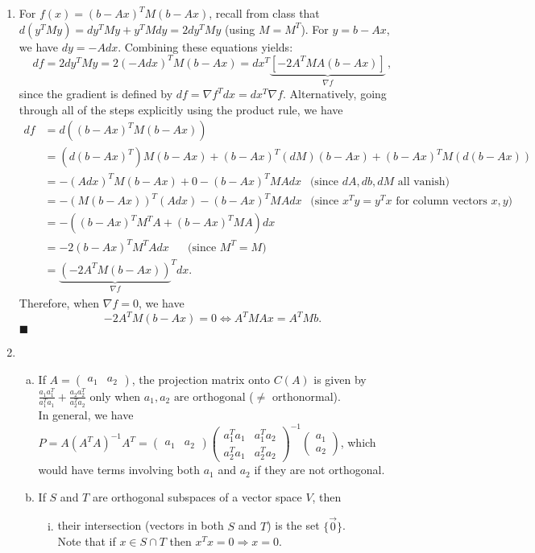 \documentclass[12pt]{article}
\begin{document}
\begin{enumerate}[1.]
    \pagebreak
    \item For $f(x) = (b - Ax)^T M (b-Ax)$, recall from class that $d(y^T M y) = dy^T M y + y^T M dy = 2 dy^T M y$ (using $M = M^T$). For $y = b - Ax$, we have $dy = -Adx$. Combining these equations yields:
    \[
    df = 2 dy^T M y = 2 (-Adx)^T M (b - Ax) = dx^T \underbrace{[-2 A^T M A (b - Ax)]}_{\nabla f} \, ,
    \]
    since the gradient is defined by $df = \nabla f ^T dx = dx^T \nabla f$.  Alternatively, going through all of the steps explicitly using the product rule, we have
    \[
    \begin{split}
    df &= d((b - Ax)^T M (b-Ax)) \\
    &= (d(b - Ax)^T) M (b-Ax) + (b - Ax)^T (dM) (b-Ax) + (b - Ax)^T M (d(b-Ax)) \\
    &= -(A dx)^T M (b-Ax) + 0 - (b - Ax)^T M A dx \ \ \text{ (since $dA, db, dM$ all vanish)}\\
    &=-(M(b-Ax))^T (A dx) - (b-Ax)^T M A dx \ \ \text{ (since $x^T y = y^T x$ for column vectors $x,y$)}\\
    &=-((b-Ax)^T M^T A + (b-Ax)^T MA) dx\\
    &=-2(b-Ax)^T M^T A dx \ \ \ \ \ \  \text{ (since $M^T = M$)}\\
    &= {\underbrace{(-2A^T M (b-Ax))}_{\nabla f}}^T dx.
    \end{split}
    \]
    Therefore, when $\nabla f = 0$, we have
    \[-2A^T M (b-Ax) = 0 \Longleftrightarrow \boxed{A^T M A x = A^T Mb}.\]
        \hfill $\blacksquare$
        \newpage
    \item
    \begin{enumerate}[(a)]
        \item  If $A = \begin{pmatrix} a_1 & a_2 \end{pmatrix}$, the projection matrix onto $C(A)$ is given by $\frac{a_1 a_1^T}{a_1^T a_1} + \frac{a_2 a_2^T}{a_2^T a_2}$ only when $\boxed{a_1, a_2 \text{ are orthogonal}}$ ($\ne$ orthonormal).\\
        In general, we have $P = A (A^T A)^{-1} A^T = \begin{pmatrix} a_1 & a_2 \end{pmatrix} \begin{pmatrix} a_1^T a_1 & a_1^T a_2 \\ a_2^T a_1 & a_2^T a_2 \end{pmatrix}^{-1}  \begin{pmatrix} a_1 \\ a_2 \end{pmatrix}$, which would have terms involving both $a_1$ and $a_2$ if they are not orthogonal.
        \item If $S$ and $T$ are orthogonal subspaces of a vector space $V$, then
        \begin{enumerate}[(i)]
            \item their intersection (vectors in both $S$ and $T$) is the set $\boxed{\{\vec{0}\}}$. \\Note that if $x \in S \cap T$ then $x^T x = 0 \Rightarrow x = 0$.
            

\end{enumerate}
\end{enumerate}
\end{enumerate}
\end{document}
